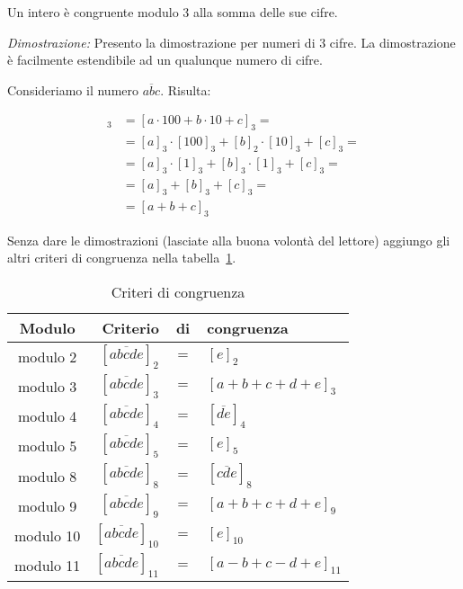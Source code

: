     \begin{teorema}
        Un intero è congruente modulo 3 alla somma delle sue cifre.
    \end{teorema}
    \begin{dimostrazione}
        \emph{Dimostrazione:}
        Presento la dimostrazione per numeri di 3 cifre. La dimostrazione è facilmente estendibile ad un qualunque numero di cifre.

        Consideriamo il numero $\overline{abc}$. Risulta:

        \begin{align*}
            [\overline{abc}]_3 &= [a \cdot 100 + b \cdot 10 + c]_3 = \\
            &= [a]_3 \cdot [100]_3 + [b]_2 \cdot [10]_3 + [c]_3 = \\
            &= [a]_3 \cdot [1]_3 + [b]_3 \cdot [1]_3 + [c]_3 = \\
            &= [a]_3 + [b]_3 + [c]_3 = \\
            &= [a + b + c]_3
        \end{align*}
    \end{dimostrazione}

Senza dare le dimostrazioni (lasciate alla buona volontà del lettore) aggiungo gli altri criteri di congruenza nella tabella~\ref{tab:criteri_congruenza}.

\begin{table}[tp]
    \begin{mdframed}    
        \label{tab:criteri_congruenza}
        \centering
        \begin{tabular}{c|rcl}
            \toprule
            Modulo & Criterio & di & congruenza \\
            \midrule
            modulo 2 & $[\overline{abcde}]_2 $ & $ = $ & $ [e]_2$ \\
            modulo 3 & $[\overline{abcde}]_3 $ & $ = $ & $ [a + b + c + d + e]_3$ \\
            modulo 4 & $[\overline{abcde}]_4 $ & $ = $ & $ [\overline{de}]_4$ \\
            modulo 5 & $[\overline{abcde}]_5 $ & $ = $ & $ [e]_5$ \\
            modulo 8 & $[\overline{abcde}]_8 $ & $ = $ & $ [\overline{cde}]_8$ \\
            modulo 9 & $[\overline{abcde}]_9 $ & $ = $ & $ [a + b + c + d + e]_9$ \\
            modulo 10 & $[\overline{abcde}]_{10} $ & $ = $ & $ [e]_{10}$ \\
            modulo 11 & $[\overline{abcde}]_{11} $ & $ = $ & $ [a - b + c - d + e]_{11}$ \\
            \bottomrule
        \end{tabular}
        \caption{Criteri di congruenza}
    \end{mdframed}
\end{table}

